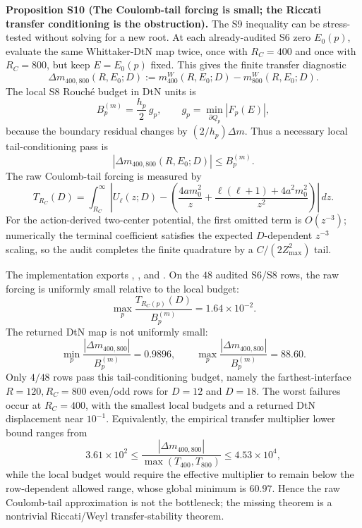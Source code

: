 \documentclass[aps,prd,onecolumn,notitlepage,nofootinbib,superscriptaddress,11pt,floatfix]{revtex4-2}
\begin{document}
\medskip\noindent\textbf{Proposition S10 (The Coulomb-tail forcing is small; the Riccati transfer conditioning is the obstruction).}
The S9 inequality can be stress-tested without solving for a new root.  At each already-audited S6 zero \(E_0(p)\), evaluate the same Whittaker-DtN map twice, once with \(R_C=400\) and once with \(R_C=800\), but keep \(E=E_0(p)\) fixed.  This gives the finite transfer diagnostic
\[
\Delta m_{400,800}(R,E_0;D)
:=
m_{400}^{W}(R,E_0;D)-m_{800}^{W}(R,E_0;D).
\]
The local S8 Rouché budget in DtN units is
\[
B_p^{(m)}
=\frac{h_p}{2}\,g_p,
\qquad
g_p=\min_{\partial Q_p}|F_p(E)|,
\]
because the boundary residual changes by \((2/h_p)\Delta m\).  Thus a necessary local tail-conditioning pass is
\[
|\Delta m_{400,800}(R,E_0;D)|\le B_p^{(m)}.
\]
The raw Coulomb-tail forcing is measured by
\[
T_{R_C}(D)
=
\int_{R_C}^{\infty}
\left|
U_\ell(z;D)
-\left(\frac{4am_0^2}{z}
+\frac{\ell(\ell+1)+4a^2m_0^2}{z^2}\right)
\right|\,dz .
\]
For the action-derived two-center potential, the first omitted term is \(O(z^{-3})\); numerically the terminal coefficient satisfies the expected \(D\)-dependent \(z^{-3}\) scaling, so the audit completes the finite quadrature by a \(C/(2Z_{\max}^2)\) tail.

The implementation  exports , , and .  On the \(48\) audited S6/S8 rows, the raw forcing is uniformly small relative to the local budget:
\[
\max_p \frac{T_{R_C(p)}(D)}{B_p^{(m)}}=1.64\times10^{-2}.
\]
The returned DtN map is not uniformly small:
\[
\min_p\frac{|\Delta m_{400,800}|}{B_p^{(m)}}=0.9896,\qquad
\max_p\frac{|\Delta m_{400,800}|}{B_p^{(m)}}=88.60 .
\]
Only \(4/48\) rows pass this tail-conditioning budget, namely the farthest-interface \(R=120,R_C=800\) even/odd rows for \(D=12\) and \(D=18\).  The worst failures occur at \(R_C=400\), with the smallest local budgets and a returned DtN displacement near \(10^{-1}\).  Equivalently, the empirical transfer multiplier lower bound ranges from
\[
3.61\times10^{2}
\le
\frac{|\Delta m_{400,800}|}{\max(T_{400},T_{800})}
\le
4.53\times10^{4},
\]
while the local budget would require the effective multiplier to remain below the row-dependent allowed range, whose global minimum is \(60.97\).  Hence the raw Coulomb-tail approximation is not the bottleneck; the missing theorem is a nontrivial Riccati/Weyl transfer-stability theorem.
\end{document}
